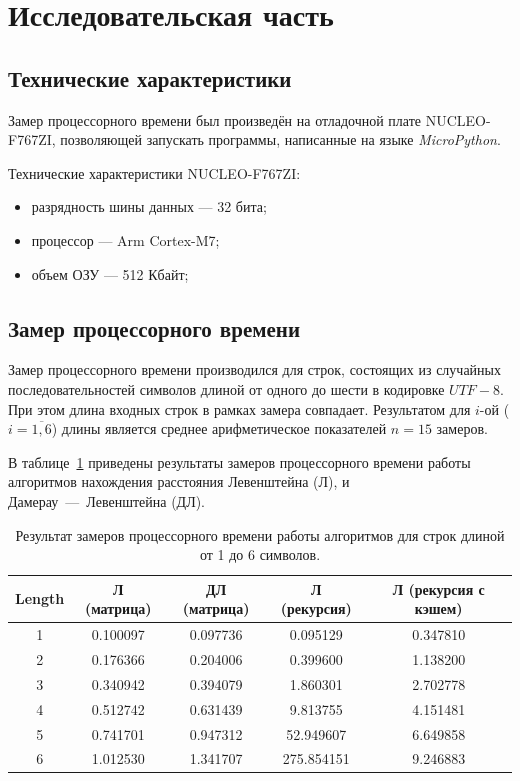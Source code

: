 \section{Исследовательская часть}

\subsection{Технические характеристики}

Замер процессорного времени был произведён на отладочной плате NUCLEO-F767ZI\cite{stm}, позволяющей запускать программы, написанные на языке \textit{MicroPython}\cite{python}.

Технические характеристики NUCLEO-F767ZI:
\begin{itemize}
    \item разрядность шины данных --- 32 бита;
    \item процессор --- Arm Cortex-M7;
    \item объем ОЗУ --- 512 Кбайт;
\end{itemize}

\subsection{Замер процессорного времени}

Замер процессорного времени производился для строк, состоящих из случайных последовательностей символов длиной от одного до шести в кодировке $UTF-8$. При этом длина входных строк в рамках замера совпадает. Результатом для $i$-ой ($i=\overline{1,6}$) длины является среднее арифметическое показателей $n=15$ замеров. 

В таблице~\ref{table:timings} приведены результаты замеров процессорного времени работы алгоритмов нахождения расстояния Левенштейна (Л), и Дамерау~---~Левенштейна (ДЛ).

\begin{table}[htb]
\caption{\centering Результат замеров процессорного времени работы алгоритмов для строк длиной от 1 до 6 символов.}
\small
\centering\begin{tabular}{|c|c|c|c|c|}
    \hline
    \textbf{Length} & \textbf{Л (матрица)} & \textbf{ДЛ (матрица)} & \textbf{Л (рекурсия)} & \textbf{Л (рекурсия с кэшем)} \\
    \hline
    1 & 0.100097 & 0.097736 & 0.095129 & 0.347810 \\
    2 & 0.176366 & 0.204006 & 0.399600 & 1.138200 \\
    3 & 0.340942 & 0.394079 & 1.860301 & 2.702778 \\
    4 & 0.512742 & 0.631439 & 9.813755 & 4.151481 \\
    5 & 0.741701 & 0.947312 & 52.949607 & 6.649858 \\
    6 & 1.012530 & 1.341707 & 275.854151 & 9.246883 \\
    \hline
\end{tabular}
\label{table:timings}
\end{table}

